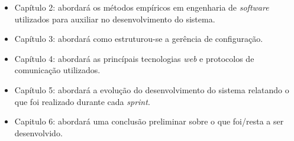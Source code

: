 \begin{itemize}
    \item Capítulo 2: abordará os métodos empíricos em engenharia de \textit{software} utilizados para
    auxiliar no desenvolvimento do sistema.
    \item Capítulo 3: abordará como estruturou-se a gerência de configuração.
    \item Capítulo 4: abordará as princípais tecnologias \textit{web} e protocolos de comunicação utilizados.
    \item Capítulo 5: abordará a evolução do desenvolvimento do sistema relatando o que foi realizado durante cada \textit{sprint}.
    \item Capitulo 6: abordará uma conclusão preliminar sobre o que foi/resta a ser desenvolvido.
\end{itemize}